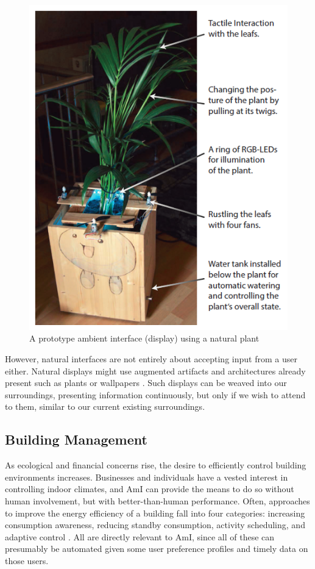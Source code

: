 \documentclass{article}
\begin{document}
\begin{figure}
  \begin{center}
    \includegraphics[width=.8\linewidth]{infoplant}
  \end{center}
  \caption{A prototype ambient interface (display) using a natural plant \cite{7390646}}
  \label{infoplant}
\end{figure}

However, natural interfaces are not entirely about accepting input from a user either. Natural displays might use augmented artifacts and architectures already present such as plants \cite{7390646} or wallpapers \cite{Huang:2005:IW:1086057.1086142}. Such displays can be weaved into our surroundings, presenting information continuously, but only if we wish to attend to them, similar to our current existing surroundings.

%
\subsection{Building Management}
As ecological and financial concerns rise, the desire to efficiently control building environments increases. Businesses and individuals have a vested interest in controlling indoor climates, and AmI can provide the means to do so without human involvement, but with better-than-human performance. Often, approaches to improve the energy efficiency of a building fall into four categories: increasing consumption awareness, reducing standby consumption, activity scheduling, and adaptive control \cite{DePaola:2014:IMS:2620784.2611779}. All are directly relevant to AmI, since all of these can presumably be automated given some user preference profiles and timely data on those users.
\end{document}
